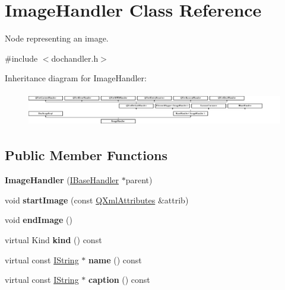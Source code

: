 \hypertarget{class_image_handler}{}\section{Image\+Handler Class Reference}
\label{class_image_handler}


Node representing an image.  




{\ttfamily \#include $<$dochandler.\+h$>$}

Inheritance diagram for Image\+Handler\+:\begin{figure}[H]
\begin{center}
\leavevmode
\includegraphics[height=1.523810cm]{class_image_handler}
\end{center}
\end{figure}
\subsection*{Public Member Functions}
\begin{DoxyCompactItemize}
\item 
\mbox{\label{class_image_handler_a9a5da110366dc1a55e3262e4e93bcdc3}} 
{\bfseries Image\+Handler} (\mbox{\hyperlink{class_i_base_handler}{I\+Base\+Handler}} $\ast$parent)
\item 
\mbox{\label{class_image_handler_a5cb1f2af496d9e8d576e6a97d9183fa3}} 
void {\bfseries start\+Image} (const \mbox{\hyperlink{class_q_xml_attributes}{Q\+Xml\+Attributes}} \&attrib)
\item 
\mbox{\label{class_image_handler_aae665494acc2f1e0a1682db1729a1b2e}} 
void {\bfseries end\+Image} ()
\item 
\mbox{\label{class_image_handler_a3302fa85356a28c1414a80175c850c64}} 
virtual Kind {\bfseries kind} () const
\item 
\mbox{\label{class_image_handler_a9397d2ab33da7c6fa9ff4f94f27bebef}} 
virtual const \mbox{\hyperlink{class_i_string}{I\+String}} $\ast$ {\bfseries name} () const
\item 
\mbox{\label{class_image_handler_a4e91d263f7f50a834d861568f03bc511}} 
virtual const \mbox{\hyperlink{class_i_string}{I\+String}} $\ast$ {\bfseries caption} () const
\end{DoxyCompactItemize}
